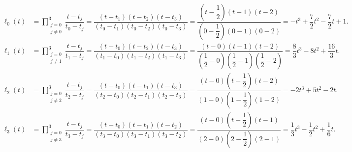 \begin{frame}
\begin{solution}
		\begin{align*}
			\ell_{0}\left(t\right) & =
			\prod\limits_{\substack{j=0               \\j\neq 0}}^{3}
			\dfrac{t-t_{j}}{t_{0}-t_{j}}=
			\dfrac{\left(t-t_{1}\right)\left(t-t_{2}\right)\left(t-t_{3}\right)}{\left(t_{0}-t_{1}\right)\left(t_{0}-t_{2}\right)\left(t_{0}-t_{3}\right)}=
			\dfrac{\left(t-\dfrac{1}{2}\right)\left(t-1\right)\left(t-2\right)}{\left(0-\dfrac{1}{2}\right)\left(0-1\right)\left(0-2\right)}=
			-t^{3}+\dfrac{7}{2}t^{2}-\dfrac{7}{2}t+1. \\
			\ell_{1}\left(t\right) & =
			\prod\limits_{\substack{j=0               \\j\neq 1}}^{3}
			\dfrac{t-t_{j}}{t_{1}-t_{j}}=
			\dfrac{\left(t-t_{0}\right)\left(t-t_{2}\right)\left(t-t_{3}\right)}{\left(t_{1}-t_{0}\right)\left(t_{1}-t_{2}\right)\left(t_{1}-t_{3}\right)}=
			\dfrac{\left(t-0\right)\left(t-1\right)\left(t-2\right)}{\left(\dfrac{1}{2}-0\right)\left(\dfrac{1}{2}-1\right)\left(\dfrac{1}{2}-2\right)}=
			\dfrac{8}{3}t^{3}-8t^{2}+\dfrac{16}{3}t.  \\
			\ell_{2}\left(t\right) & =
			\prod\limits_{\substack{j=0               \\j\neq 2}}^{3}
			\dfrac{t-t_{j}}{t_{2}-t_{j}}=
			\dfrac{\left(t-t_{0}\right)\left(t-t_{1}\right)\left(t-t_{3}\right)}{\left(t_{2}-t_{0}\right)\left(t_{2}-t_{1}\right)\left(t_{2}-t_{3}\right)}=
			\dfrac{\left(t-0\right)\left(t-\dfrac{1}{2}\right)\left(t-2\right)}{\left(1-0\right)\left(1-\dfrac{1}{2}\right)\left(1-2\right)}=
			-2t^{3}+5t^{2}-2t.                        \\
			\ell_{3}\left(t\right) & =
			\prod\limits_{\substack{j=0               \\j\neq 3}}^{3}
			\dfrac{t-t_{j}}{t_{3}-t_{j}}=
			\dfrac{\left(t-t_{0}\right)\left(t-t_{1}\right)\left(t-t_{2}\right)}{\left(t_{3}-t_{0}\right)\left(t_{3}-t_{1}\right)\left(t_{3}-t_{2}\right)}=
			\dfrac{\left(t-0\right)\left(t-\dfrac{1}{2}\right)\left(t-1\right)}{\left(2-0\right)\left(2-\dfrac{1}{2}\right)\left(2-1\right)}=
			\dfrac{1}{3}t^{3}-\dfrac{1}{2}t^{2}+\dfrac{1}{6}t.
		\end{align*}
	\end{solution}
\end{frame}


